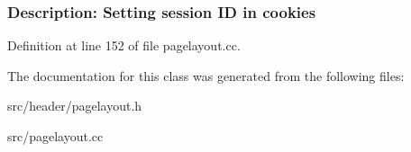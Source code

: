  \subsubsection*{Description\-: Setting session I\-D in cookies }

Definition at line 152 of file pagelayout.\-cc.



The documentation for this class was generated from the following files\-:\begin{DoxyCompactItemize}
\item 
src/header/pagelayout.\-h\item 
src/pagelayout.\-cc\end{DoxyCompactItemize}
